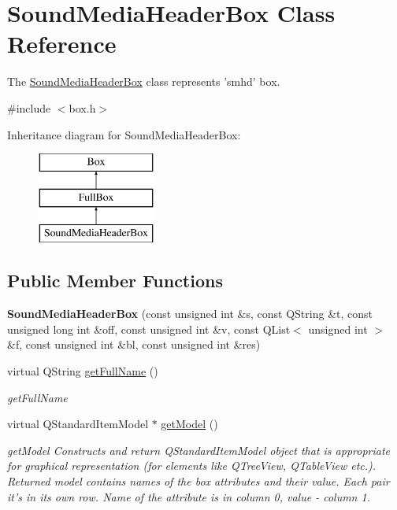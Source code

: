 \hypertarget{class_sound_media_header_box}{\section{Sound\-Media\-Header\-Box Class Reference}
\label{class_sound_media_header_box}
}


The \hyperlink{class_sound_media_header_box}{Sound\-Media\-Header\-Box} class represents 'smhd' box.  




{\ttfamily \#include $<$box.\-h$>$}

Inheritance diagram for Sound\-Media\-Header\-Box\-:\begin{figure}[H]
\begin{center}
\leavevmode
\includegraphics[height=3.000000cm]{class_sound_media_header_box}
\end{center}
\end{figure}
\subsection*{Public Member Functions}
\begin{DoxyCompactItemize}
\item 
\hypertarget{class_sound_media_header_box_adb2e32b3a554933b2587cf3b455be2c4}{{\bfseries Sound\-Media\-Header\-Box} (const unsigned int \&s, const Q\-String \&t, const unsigned long int \&off, const unsigned int \&v, const Q\-List$<$ unsigned int $>$ \&f, const unsigned int \&bl, const unsigned int \&res)}\label{class_sound_media_header_box_adb2e32b3a554933b2587cf3b455be2c4}

\item 
virtual Q\-String \hyperlink{class_sound_media_header_box_a942002b38261d7b015d9309ca02ccab6}{get\-Full\-Name} ()
\begin{DoxyCompactList}\small\item\em get\-Full\-Name \end{DoxyCompactList}\item 
virtual Q\-Standard\-Item\-Model $\ast$ \hyperlink{class_sound_media_header_box_acc53b76481ed9c6e544b27c416f756e5}{get\-Model} ()
\begin{DoxyCompactList}\small\item\em get\-Model Constructs and return Q\-Standard\-Item\-Model object that is appropriate for graphical representation (for elements like Q\-Tree\-View, Q\-Table\-View etc.). Returned model contains names of the box attributes and their value. Each pair it's in its own row. Name of the attribute is in column 0, value -\/ column 1. \end{DoxyCompactList}\end{DoxyCompactItemize}
